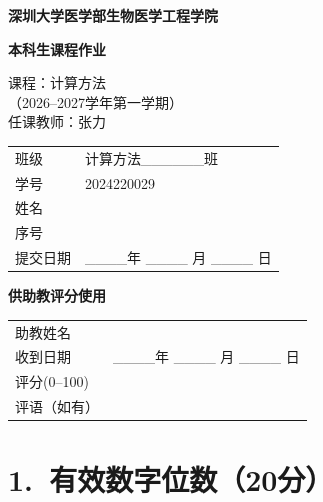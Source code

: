 \documentclass[a4paper,11pt]{ctexart}
\begin{document}
\begin{titlepage}
  \centering
  {\bfseries 深圳大学医学部生物医学工程学院\par}
  \vspace{1.2em}
  {\bfseries 本科生课程作业\par}
  \vspace{2.5em}
  {
    课程：计算方法\\
    （2026--2027学年第一学期）\\
    任课教师：张力\par}
  \vspace{2.5em}

  {
  \renewcommand{\arraystretch}{1.6}
  \begin{tabular}{p{3.5em}p{18em}}
    班级 & 计算方法\_\_\_\_\_\_班 \\[0.4em]
    学号 & 2024220029 \\[0.4em]
    姓名 & \\[0.4em]
    序号 & \\[0.4em]
    提交日期 & \_\_\_\_年 \_\_\_\_ 月 \_\_\_\_ 日 \\
  \end{tabular}
  \par}

  \vspace{2.5em}
  {\bfseries 供助教评分使用\par}
  \vspace{1em}
  {
  \renewcommand{\arraystretch}{1.6}
  \begin{tabular}{p{4.5em}p{17em}}
    助教姓名 & \\[0.4em]
    收到日期 & \_\_\_\_年 \_\_\_\_ 月 \_\_\_\_ 日 \\[0.4em]
    评分(0--100) & \\[0.4em]
    评语（如有） & \\[0.4em]
  \end{tabular}
  \par}
\end{titlepage}

\setcounter{section}{0}

\section*{1.\ 有效数字位数（20分）}
\end{document}
